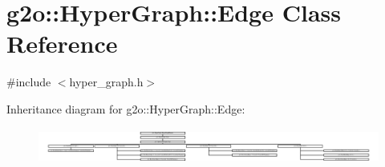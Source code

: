 \hypertarget{classg2o_1_1_hyper_graph_1_1_edge}{}\section{g2o\+:\+:Hyper\+Graph\+:\+:Edge Class Reference}
\label{classg2o_1_1_hyper_graph_1_1_edge}


{\ttfamily \#include $<$hyper\+\_\+graph.\+h$>$}

Inheritance diagram for g2o\+:\+:Hyper\+Graph\+:\+:Edge\+:\begin{figure}[H]
\begin{center}
\leavevmode
\includegraphics[height=1.176471cm]{classg2o_1_1_hyper_graph_1_1_edge}
\end{center}
\end{figure}
